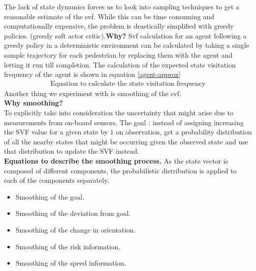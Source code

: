 The lack of state dynamics forces us to look into sampling techniques to get a reasonable estimate of the svf. While this can be time consuming and computationally expensive, the problem is drastically simplified with greedy policies. (greedy soft actor critic).\textbf{Why?} 
Svf calculation for an agent following a greedy policy in a deterministic environment can be calculated by taking a single sample trajectory for each pedestrian by replacing them with the agent and letting it run till completion. The calculation of the expected state visitation frequency of the agent is shown in equation \ref{agent-approx}
\begin{align}
\label{agent-approx}
\text{Equation to calculate the state visitation frequency}
\end{align}
Another thing we experiment with is smoothing of the svf. \\
\textbf{Why smoothing?}\\
To explicitly take into consideration the uncertainty that might arise due to measurements from on-board sensors. The goal : instead of assigning increasing the SVF value for a given state by $1$ on observation, get a probability distribution of all the nearby states that might be occurring given the observed state and use that distribution to update the SVF instead.\\
\textbf{Equations to describe the smoothing process.}
As the state vector is composed of different components, the probabilistic distribution is applied to each of the components separately.
\begin{itemize}
	\item Smoothing of the goal.
	\item Smoothing of the deviation from goal.
	\item Smoothing of the change in orientation.
	\item Smoothing of the risk information.
	\item Smoothing of the speed information.
\end{itemize}


